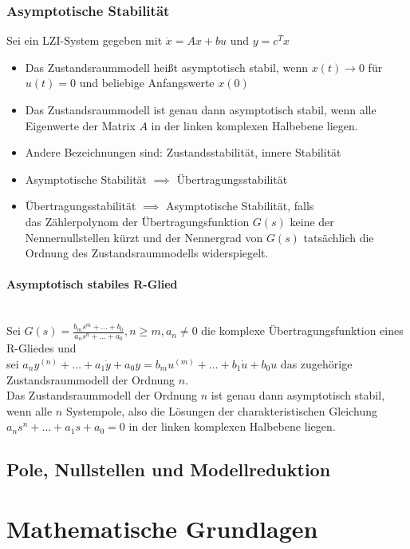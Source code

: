 \documentclass[10pt,a4paper]{article}
\begin{document}
\subsubsection{Asymptotische Stabilität}
Sei ein LZI-System gegeben mit $\dot x = Ax + bu$ und $y = c^T x$
\begin{itemize}
	\item Das Zustandsraummodell heißt asymptotisch stabil, wenn $x(t) → 0$ für $u(t) = 0$ und beliebige Anfangswerte $x(0)$
	\item Das Zustandsraummodell ist genau dann asymptotisch stabil, wenn alle Eigenwerte der Matrix $A$ in der linken komplexen Halbebene liegen.
	\item Andere Bezeichnungen sind: Zustandsstabilität, innere Stabilität
	\item Asymptotische Stabilität $\implies$ Übertragungsstabilität
	\item Übertragungsstabilität $\implies$ Asymptotische Stabilität, falls \\ das Zählerpolynom der Übertragungsfunktion $G(s)$ keine der Nennernullstellen kürzt und der Nennergrad von $G(s)$ tatsächlich die Ordnung des Zustandsraummodells widerspiegelt.
\end{itemize}

\paragraph{Asymptotisch stabiles R-Glied} ~\\
Sei $G(s) = \frac{b_m s^m + \dots + b_0}{a_n s^n + \dots + a_0}, n ≥ m, a_n ≠ 0$ die komplexe Übertragungsfunktion eines R-Gliedes und \\
sei $a_n y^{(n)} + \dots + a_1 \dot y + a_0 y = b_m u^{(m)} + \dots + b_1 \dot u + b_0 u$ das zugehörige Zustandsraummodell der Ordnung $n$. \\
Das Zustandsraummodell der Ordnung $n$ ist genau dann asymptotisch stabil, wenn alle $n$ Systempole, also die Lösungen der charakteristischen Gleichung $a_n s^n + \dots + a_1 s + a_0 = 0$ in der linken komplexen Halbebene liegen.

\subsection{Pole, Nullstellen und Modellreduktion}






\pagebreak
\section{Mathematische Grundlagen}
\end{document}
